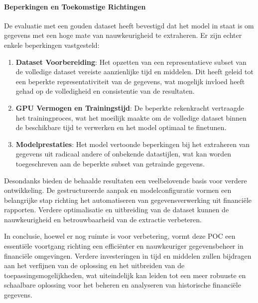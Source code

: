 \paragraph{Beperkingen en Toekomstige Richtingen}
De evaluatie met een gouden dataset heeft bevestigd dat het model in staat is om gegevens met een hoge mate van nauwkeurigheid te extraheren. Er zijn echter enkele beperkingen vastgesteld:
\begin{enumerate}
    \item \textbf{Dataset Voorbereiding}: Het opzetten van een representatieve subset van de volledige dataset vereiste aanzienlijke tijd en middelen. Dit heeft geleid tot een beperkte representativiteit van de gegevens, wat mogelijk invloed heeft gehad op de volledigheid en consistentie van de resultaten.
    
    \item \textbf{GPU Vermogen en Trainingstijd}: De beperkte rekenkracht vertraagde het trainingproces, wat het moeilijk maakte om de volledige dataset binnen de beschikbare tijd te verwerken en het model optimaal te finetunen.
    
    \item \textbf{Modelprestaties}: Het model vertoonde beperkingen bij het extraheren van gegevens uit radicaal andere of onbekende datastijlen, wat kan worden toegeschreven aan de beperkte subset van getrainde gegevens.
\end{enumerate}

Desondanks bieden de behaalde resultaten een veelbelovende basis voor verdere ontwikkeling. De gestructureerde aanpak en modelconfiguratie vormen een belangrijke stap richting het automatiseren van gegevensverwerking uit financiële rapporten. Verdere optimalisatie en uitbreiding van de dataset kunnen de nauwkeurigheid en betrouwbaarheid van de extractie verbeteren.

In conclusie, hoewel er nog ruimte is voor verbetering, vormt deze POC een essentiële voortgang richting een efficiënter en nauwkeuriger gegevensbeheer in financiële omgevingen. Verdere investeringen in tijd en middelen zullen bijdragen aan het verfijnen van de oplossing en het uitbreiden van de toepassingsmogelijkheden, wat uiteindelijk kan leiden tot een meer robuuste en schaalbare oplossing voor het beheren en analyseren van historische financiële gegevens.